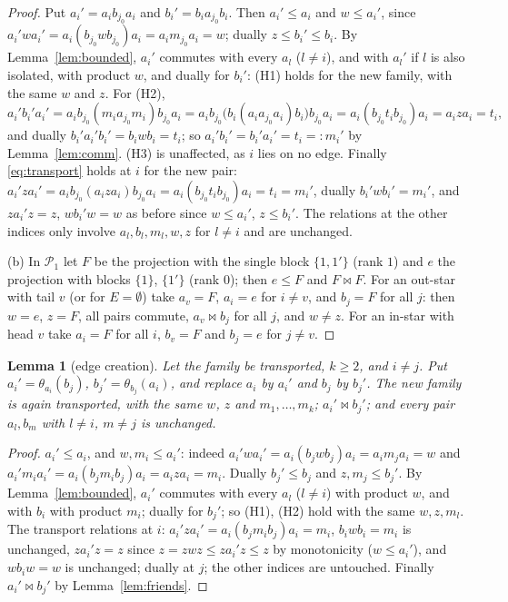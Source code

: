 \documentclass[11pt]{amsart}
\newtheorem{lemma}[theorem]{Lemma}
\theoremstyle{definition}
\renewcommand{\P}{\mathcal{P}}      %
\newcommand{\mt}{\bowtie}      %
\begin{document}
\begin{proof}
Put $a_i'=a_ib_{j_0}a_i$ and $b_i'=b_ia_{j_0}b_i$. Then $a_i'\le a_i$ and $w\le a_i'$, since $a_i'wa_i'=a_i(b_{j_0}wb_{j_0})a_i=a_im_{j_0}a_i=w$; dually $z\le b_i'\le b_i$. By Lemma~\ref{lem:bounded}, $a_i'$ commutes with every $a_l$ ($l\ne i$), and with $a_l'$ if $l$ is also isolated, with product $w$, and dually for $b_i'$: (H1) holds for the new family, with the same $w$ and $z$. For (H2),
\[
a_i'b_i'a_i'=a_ib_{j_0}(m_ia_{j_0}m_i)b_{j_0}a_i=a_ib_{j_0}\bigl(b_i(a_ia_{j_0}a_i)b_i\bigr)b_{j_0}a_i=a_i(b_{j_0}t_ib_{j_0})a_i=a_iza_i=t_i ,
\]
and dually $b_i'a_i'b_i'=b_iwb_i=t_i$; so $a_i'b_i'=b_i'a_i'=t_i=:m_i'$ by Lemma~\ref{lem:comm}. (H3) is unaffected, as $i$ lies on no edge. Finally \eqref{eq:transport} holds at $i$ for the new pair: $a_i'za_i'=a_ib_{j_0}(a_iza_i)b_{j_0}a_i=a_i(b_{j_0}t_ib_{j_0})a_i=t_i=m_i'$, dually $b_i'wb_i'=m_i'$, and $za_i'z=z$, $wb_i'w=w$ as before since $w\le a_i'$, $z\le b_i'$. The relations at the other indices only involve $a_l,b_l,m_l,w,z$ for $l\ne i$ and are unchanged.

(b) In $\P_1$ let $F$ be the projection with the single block $\{1,1'\}$ (rank $1$) and $e$ the projection with blocks $\{1\}$, $\{1'\}$ (rank $0$); then $e\le F$ and $F\mt F$. For an out-star with tail $v$ (or for $E=\emptyset$) take $a_v=F$, $a_i=e$ for $i\ne v$, and $b_j=F$ for all $j$: then $w=e$, $z=F$, all pairs commute, $a_v\mt b_j$ for all $j$, and $w\ne z$. For an in-star with head $v$ take $a_i=F$ for all $i$, $b_v=F$ and $b_j=e$ for $j\ne v$.
\end{proof}

\begin{lemma}[edge creation]\label{lem:create}
Let the family be transported, $k\ge2$, and $i\ne j$. Put $a_i'=\theta_{a_i}(b_j)$, $b_j'=\theta_{b_j}(a_i)$, and replace $a_i$ by $a_i'$ and $b_j$ by $b_j'$. The new family is again transported, with the same $w$, $z$ and $m_1,\dots,m_k$; $a_i'\mt b_j'$; and every pair $a_l,b_m$ with $l\ne i$, $m\ne j$ is unchanged.
\end{lemma}

\begin{proof}
$a_i'\le a_i$, and $w,m_i\le a_i'$: indeed $a_i'wa_i'=a_i(b_jwb_j)a_i=a_im_ja_i=w$ and $a_i'm_ia_i'=a_i(b_jm_ib_j)a_i=a_iza_i=m_i$. Dually $b_j'\le b_j$ and $z,m_j\le b_j'$. By Lemma~\ref{lem:bounded}, $a_i'$ commutes with every $a_l$ ($l\ne i$) with product $w$, and with $b_i$ with product $m_i$; dually for $b_j'$; so (H1), (H2) hold with the same $w,z,m_l$. The transport relations at $i$: $a_i'za_i'=a_i(b_jm_ib_j)a_i=m_i$, $b_iwb_i=m_i$ is unchanged, $za_i'z=z$ since $z=zwz\le za_i'z\le z$ by monotonicity ($w\le a_i'$), and $wb_iw=w$ is unchanged; dually at $j$; the other indices are untouched. Finally $a_i'\mt b_j'$ by Lemma~\ref{lem:friends}.
\end{proof}
\end{document}
